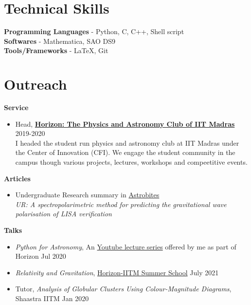 \documentclass[margin, centered]{res}
\begin{document}
\begin{resume}









\section{Technical \hspace{2mm} Skills}
\textbf{Programming Languages} - Python, C, C++, Shell script\\
\textbf{Softwares} - Mathematica, SAO DS9 \\
\textbf{Tools/Frameworks} - \LaTeX, Git



\section{Outreach}

\textbf{Service}
\begin{itemize}[leftmargin=*]
    \item Head, \href{https://horizoniitm.github.io/horizon/}{\textbf{Horizon: The Physics and Astronomy Club of IIT Madras}} \hfill 2019-2020\\
     I headed the student run physics and astronomy club at IIT Madras under the Center of Innovation (CFI).
    We engage the student community in the campus though various projects, lectures, workshops and compeetitive events.
\end{itemize}
\textbf{Articles}
\begin{itemize}[leftmargin=*]
    \item Undergraduate Research summary in \href{https://astrobites.org/2021/06/20/ur-a-spectropolarimetric-method-for-predicting-the-gravitational-wave-polarisation-of-lisa-verification-binaries/}{Astrobites} \\ \textit{\color{C2} UR: A spectropolarimetric method for predicting the gravitational wave polarisation of LISA verification }
\end{itemize}

\textbf{Talks}
\begin{itemize}[leftmargin=*]
    \item \textit{\color{C2} Python for Astronomy}, An \href{https://youtu.be/HfYR0uwYAyM}{Youtube lecture series} offered by me as part of Horizon \hfill Jul 2020
    \item \textit{\color{C2} Relativity and Gravitation}, \href{https://github.com/HorizonIITM/summer-school-2021}{Horizon-IITM Summer School} \hfill July 2021
    \item Tutor, \textit{\color{C2} Analysis of Globular Clusters Using
    Colour-Magnitude Diagrams}, Shaastra IITM \hfill Jan 2020
\end{itemize}






\end{resume}
\end{document}
